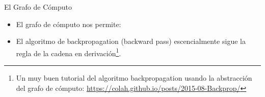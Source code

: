 \documentclass[handout]{beamer}
\begin{document}
\begin{frame}{El Grafo de Cómputo}
\begin{scriptsize}
\begin{itemize}

\item  El grafo de cómputo nos permite:


\begin{enumerate}
 \end{enumerate}
  
  
  
  
 \item El algoritmo de backpropagation (backward pass) escencialmente sigue la regla de la cadena en derivación\footnote{Un muy buen tutorial del algoritmo backpropagation usando la abstracción del grafo de cómputo: \url{https://colah.github.io/posts/2015-08-Backprop/}}.
 
  
\end{itemize}
\end{scriptsize}
\end{frame}
\end{document}
